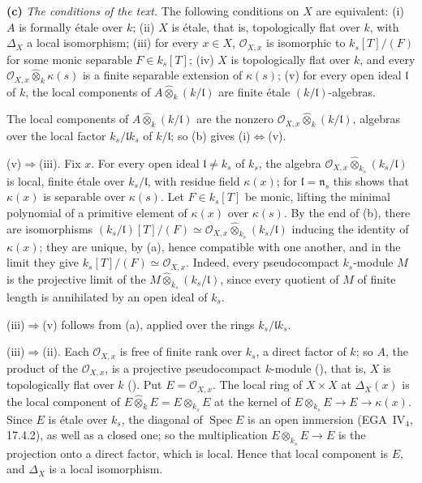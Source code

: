 
\smallskip
\noindent\textbf{(c)}
\label{sga3:VIIB:1.6.E}
\emph{The conditions of the text.} The following conditions on \(X\)
are equivalent:
\textup{(i)} \(A\) is formally étale over \(k\);
\textup{(ii)} \(X\) is étale, that is, topologically flat over \(k\),
with \(\Delta_X\) a local isomorphism;
\textup{(iii)} for every \(x\in X\), \(\mathcal O_{X,x}\) is isomorphic
to \(k_s[T]/(F)\) for some monic separable \(F\in k_s[T]\);
\textup{(iv)} \(X\) is topologically flat over \(k\), and every
\(\mathcal O_{X,x}\widehat\otimes_k\kappa(s)\) is a finite separable
extension of \(\kappa(s)\);
\textup{(v)} for every open ideal \(\mathfrak l\) of \(k\), the local
components of \(A\widehat\otimes_k(k/\mathfrak l)\) are finite étale
\((k/\mathfrak l)\)-algebras.

The local components of \(A\widehat\otimes_k(k/\mathfrak l)\) are the
nonzero \(\mathcal O_{X,x}\widehat\otimes_k(k/\mathfrak l)\), algebras
over the local factor \(k_s/\mathfrak lk_s\) of \(k/\mathfrak l\); so
\textup{(b)} gives \textup{(i)}\(\Leftrightarrow\)\textup{(v)}.

\textup{(v)}\(\Rightarrow\)\textup{(iii)}. Fix \(x\). For every open
ideal \(\mathfrak l\neq k_s\) of \(k_s\), the algebra
\(\mathcal O_{X,x}\widehat\otimes_{k_s}(k_s/\mathfrak l)\) is local,
finite étale over \(k_s/\mathfrak l\), with residue field
\(\kappa(x)\); for \(\mathfrak l=\mathfrak n_s\) this shows that
\(\kappa(x)\) is separable over \(\kappa(s)\). Let \(F\in k_s[T]\) be
monic, lifting the minimal polynomial of a primitive element of
\(\kappa(x)\) over \(\kappa(s)\). By the end of \textup{(b)}, there are
isomorphisms
\((k_s/\mathfrak l)[T]/(F)\simeq
\mathcal O_{X,x}\widehat\otimes_{k_s}(k_s/\mathfrak l)\) inducing the
identity of \(\kappa(x)\); they are unique, by \textup{(a)}, hence
compatible with one another, and in the limit they give
\(k_s[T]/(F)\simeq\mathcal O_{X,x}\). Indeed, every pseudocompact
\(k_s\)-module \(M\) is the projective limit of the
\(M\widehat\otimes_{k_s}(k_s/\mathfrak l)\), since every quotient of
\(M\) of finite length is annihilated by an open ideal of \(k_s\).

\textup{(iii)}\(\Rightarrow\)\textup{(v)} follows from \textup{(a)}, applied
over the rings \(k_s/\mathfrak lk_s\).

\textup{(iii)}\(\Rightarrow\)\textup{(ii)}. Each \(\mathcal O_{X,x}\) is
free of finite rank over \(k_s\), a direct factor of \(k\); so \(A\),
the product of the \(\mathcal O_{X,x}\), is a projective pseudocompact
\(k\)-module \textup{()}, that is, \(X\) is topologically flat
over \(k\) \textup{()}. Put \(E=\mathcal O_{X,x}\). The local ring of
\(X\times X\) at \(\Delta_X(x)\) is the local component of
\(E\widehat\otimes_kE=E\otimes_{k_s}E\) at the kernel of
\(E\otimes_{k_s}E\to E\to\kappa(x)\). Since \(E\) is étale over
\(k_s\), the diagonal of \(\operatorname{Spec}E\) is an open immersion
\textup{(EGA~\(\mathrm{IV}_4\), 17.4.2)}, as well as a closed one; so the
multiplication \(E\otimes_{k_s}E\to E\) is the projection onto a direct
factor, which is local. Hence that local component is \(E\), and
\(\Delta_X\) is a local isomorphism.

